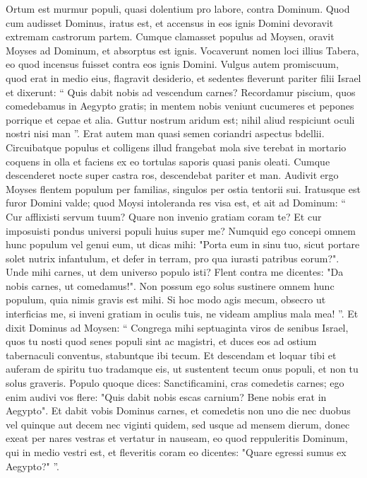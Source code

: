 \begin{biblechapter}
\begin{biblechapter}
\begin{biblechapter}
\begin{biblechapter}
\begin{biblechapter}
\begin{biblechapter}
\begin{biblechapter}
\begin{biblechapter}
\begin{biblechapter}
\begin{biblechapter}
\begin{biblechapter}
\verse Ortum est murmur populi, quasi dolentium pro labore, contra Dominum. Quod cum audisset Dominus, iratus est, et accensus in eos ignis Domini devoravit extremam castrorum partem. 
\verse Cumque clamasset populus ad Moysen, oravit Moyses ad Dominum, et absorptus est ignis. 
\verse Vocaverunt nomen loci illius Tabera, eo quod incensus fuisset contra eos ignis Domini.
 \verse Vulgus autem promiscuum, quod erat in medio eius, flagravit desiderio, et sedentes fleverunt pariter filii Israel et dixerunt: “ Quis dabit nobis ad vescendum carnes? 
\verse Recordamur piscium, quos comedebamus in Aegypto gratis; in mentem nobis veniunt cucumeres et pepones porrique et cepae et alia. 
\verse Guttur nostrum aridum est; nihil aliud respiciunt oculi nostri nisi man ”.
 \verse Erat autem man quasi semen coriandri aspectus bdellii. 
\verse Circuibatque populus et colligens illud frangebat mola sive terebat in mortario coquens in olla et faciens ex eo tortulas saporis quasi panis oleati. 
\verse Cumque descenderet nocte super castra ros, descendebat pariter et man.
 \verse Audivit ergo Moyses flentem populum per familias, singulos per ostia tentorii sui. Iratusque est furor Domini valde; quod Moysi intoleranda res visa est, 
 \verse et ait ad Dominum: “ Cur afflixisti servum tuum? Quare non invenio gratiam coram te? Et cur imposuisti pondus universi populi huius super me? 
\verse Numquid ego concepi omnem hunc populum vel genui eum, ut dicas mihi: "Porta eum in sinu tuo, sicut portare solet nutrix infantulum, et defer in terram, pro qua iurasti patribus eorum?". 
\verse Unde mihi carnes, ut dem universo populo isti? Flent contra me dicentes: "Da nobis carnes, ut comedamus!". 
\verse Non possum ego solus sustinere omnem hunc populum, quia nimis gravis est mihi. 
\verse Si hoc modo agis mecum, obsecro ut interficias me, si inveni gratiam in oculis tuis, ne videam amplius mala mea! ”.
 \verse Et dixit Dominus ad Moysen: “ Congrega mihi septuaginta viros de senibus Israel, quos tu nosti quod senes populi sint ac magistri, et duces eos ad ostium tabernaculi conventus, stabuntque ibi tecum. 
\verse Et descendam et loquar tibi et auferam de spiritu tuo tradamque eis, ut sustentent tecum onus populi, et non tu solus graveris. 
\verse Populo quoque dices: Sanctificamini, cras comedetis carnes; ego enim audivi vos flere: "Quis dabit nobis escas carnium? Bene nobis erat in Aegypto". Et dabit vobis Dominus carnes, et comedetis 
\verse non uno die nec duobus vel quinque aut decem nec viginti quidem, 
\verse sed usque ad mensem dierum, donec exeat per nares vestras et vertatur in nauseam, eo quod reppuleritis Dominum, qui in medio vestri est, et fleveritis coram eo dicentes: "Quare egressi sumus ex Aegypto?" ”. 

\end{biblechapter}
\end{biblechapter}
\end{biblechapter}
\end{biblechapter}
\end{biblechapter}
\end{biblechapter}
\end{biblechapter}
\end{biblechapter}
\end{biblechapter}
\end{biblechapter}
\end{biblechapter}
